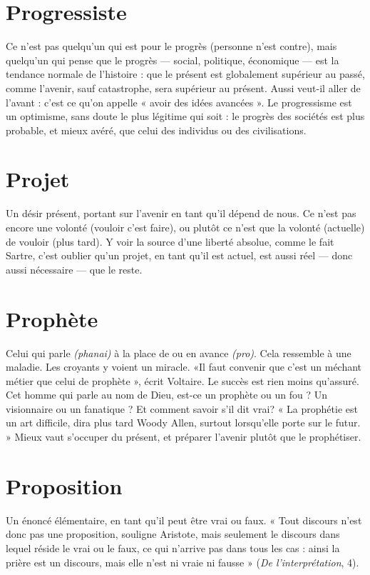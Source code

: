 \section{Progressiste}
Ce n’est pas quelqu'un qui est pour le progrès (personne
n’est contre), mais quelqu'un qui pense que le progrès —
social, politique, économique — est la tendance normale de l’histoire : que le
présent est globalement supérieur au passé, comme l'avenir, sauf catastrophe,
sera supérieur au présent. Aussi veut-il aller de l’avant : c’est ce qu’on appelle
« avoir des idées avancées ». Le progressisme est un optimisme, sans doute le
plus légitime qui soit : le progrès des sociétés est plus probable, et mieux avéré,
que celui des individus ou des civilisations.

\section{Projet}
Un désir présent, portant sur l’avenir en tant qu’il dépend de
nous. Ce n’est pas encore une volonté (vouloir c’est faire), ou
plutôt ce n’est que la volonté (actuelle) de vouloir (plus tard). Y voir la source
d’une liberté absolue, comme le fait Sartre, c’est oublier qu’un projet, en tant
qu'il est actuel, est aussi réel — donc aussi nécessaire — que le reste.

\section{Prophète}
Celui qui parle {\it (phanai)} à la place de ou en avance {\it (pro)}. Cela
ressemble à une maladie. Les croyants y voient un miracle.
«Il faut convenir que c’est un méchant métier que celui de prophète », écrit
Voltaire. Le succès est rien moins qu’assuré. Cet homme qui parle au nom de
Dieu, est-ce un prophète ou un fou ? Un visionnaire ou un fanatique ? Et comment
savoir s’il dit vrai? « La prophétie est un art difficile, dira plus tard
Woody Allen, surtout lorsqu'elle porte sur le futur. » Mieux vaut s'occuper du
présent, et préparer l'avenir plutôt que le prophétiser.

\section{Proposition}
Un énoncé élémentaire, en tant qu’il peut être vrai ou
faux. « Tout discours n’est donc pas une proposition, souligne
Aristote, mais seulement le discours dans lequel réside le vrai ou le faux,
ce qui n'arrive pas dans tous les cas : ainsi la prière est un discours, mais elle
n'est ni vraie ni fausse » ({\it De l'interprétation}, 4).

